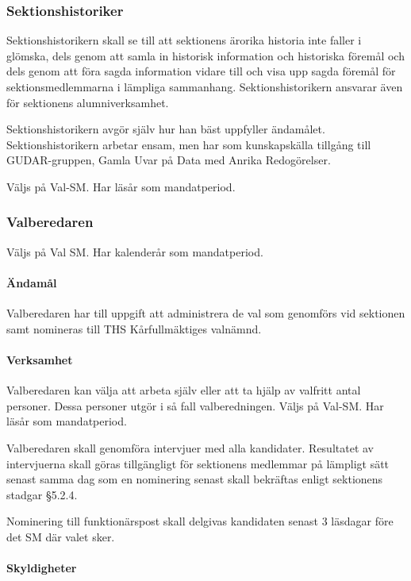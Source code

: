 \documentclass{dgovdoc}
\begin{document}
\subsubsection{Sektionshistoriker}

Sektionshistorikern skall se till att sektionens ärorika historia inte faller i
glömska, dels genom att samla in historisk information och historiska föremål
och dels genom att föra sagda information vidare till och visa upp sagda
föremål för sektionsmedlemmarna i lämpliga sammanhang. Sektionshistorikern
ansvarar även för sektionens alumniverksamhet.

Sektionshistorikern avgör själv hur han bäst uppfyller ändamålet.
Sektionshistorikern arbetar ensam, men har som kunskapskälla tillgång till
GUDAR-gruppen, Gamla Uvar på Data med Anrika Redogörelser.

Väljs på Val-SM. Har läsår som mandatperiod.

\subsubsection{Valberedaren}

Väljs på Val SM. Har kalenderår som mandatperiod.

\paragraph{Ändamål}

Valberedaren har till uppgift att administrera de val som genomförs vid
sektionen samt nomineras till THS Kårfullmäktiges valnämnd.

\paragraph{Verksamhet}

Valberedaren kan välja att arbeta själv eller att ta hjälp av valfritt antal
personer. Dessa personer utgör i så fall valberedningen. Väljs på Val-SM. Har
läsår som mandatperiod.

Valberedaren skall genomföra intervjuer med alla kandidater. Resultatet av
intervjuerna skall göras tillgängligt för sektionens medlemmar på lämpligt sätt
senast samma dag som en nominering senast skall bekräftas enligt sektionens
stadgar \S5.2.4.

Nominering till funktionärspost skall delgivas kandidaten senast 3 läsdagar
före det SM där valet sker.

\paragraph{Skyldigheter}
\end{document}
